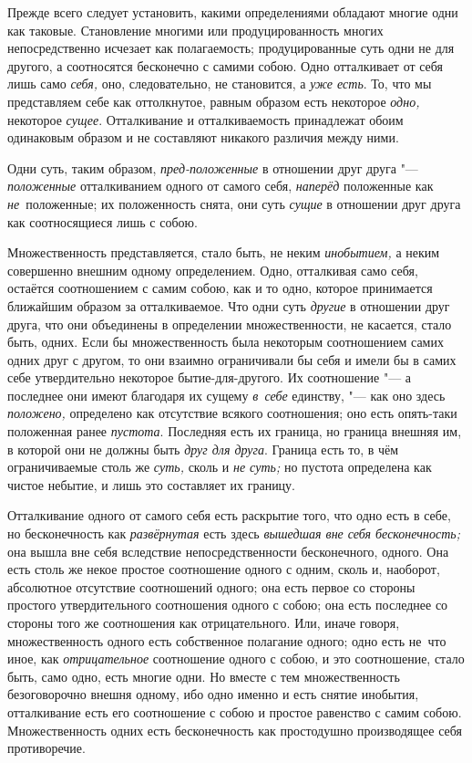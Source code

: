 Прежде всего следует установить, какими определениями обладают многие одни
как таковые. Становление многими или продуцированность многих
непосредственно исчезает как полагаемость; продуцированные суть одни не для
другого, а соотносятся бесконечно с самими собою. Одно отталкивает от себя
лишь само {\em себя,} оно, следовательно, не
становится, а {\em уже есть}. То, что мы представляем
себе как оттолкнутое, равным образом есть некоторое
{\em одно,} некоторое {\em сущее}.
Отталкивание и отталкиваемость принадлежат обоим одинаковым образом и не
составляют никакого различия между ними.

Одни суть, таким образом, {\em пред-положенные} в
отношении друг друга "--- {\em положенные} отталкиванием
одного от самого себя, {\em наперёд} положенные как
{\em не}~положенные; их положенность снята, они суть
{\em сущие} в отношении друг друга как соотносящиеся лишь с собою.

Множественность представляется, стало быть, не неким
{\em инобытием,} а неким совершенно внешним одному
определением. Одно, отталкивая само себя, остаётся соотношением с самим
собою, как и то одно, которое принимается ближайшим образом за
отталкиваемое. Что одни суть {\em другие} в отношении
друг друга, что они объединены в определении множественности, не касается,
стало быть, одних. Если бы множественность была некоторым соотношением
самих одних друг с другом, то они взаимно ограничивали бы себя и имели бы в
самих себе утвердительно некоторое бытие-для-другого. Их соотношение "--- а
последнее они имеют благодаря их сущему {\em в~себе}
единству, "--- как оно здесь {\em положено,} определено
как отсутствие всякого соотношения; оно есть опять-таки положенная ранее
{\em пустота}. Последняя есть их граница, но граница
внешняя им, в которой они не должны быть {\em друг для
друга}. Граница есть то, в чём ограничиваемые столь же
{\em суть,} сколь и {\em не суть;}
но пустота определена как чистое небытие, и лишь это составляет их границу.

Отталкивание одного от самого себя есть раскрытие того, что одно есть в
себе, но бесконечность как {\em развёрнутая} есть здесь
{\em вышедшая вне себя бесконечность;} она вышла вне
себя вследствие непосредственности бесконечного, одного. Она есть столь же
некое простое соотношение одного с одним, сколь и, наоборот, абсолютное
отсутствие соотношений одного; она есть первое со стороны простого
утвердительного соотношения одного с собою; она есть последнее со стороны
того же соотношения как отрицательного. Или, иначе говоря, множественность
одного есть собственное полагание одного; одно есть не~что иное, как
{\em отрицательное} соотношение одного с собою, и это
соотношение, стало быть, само одно, есть многие одни. Но вместе с тем
множественность безоговорочно внешня одному, ибо одно именно и есть снятие
инобытия, отталкивание есть его соотношение с собою и простое равенство с
самим собою. Множественность одних есть бесконечность как простодушно
производящее себя противоречие.

